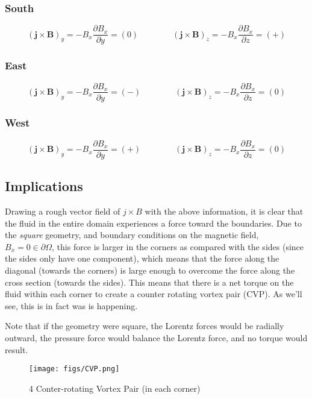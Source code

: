 \documentclass[11pt]{article}
\newcommand{\BfigS}{50em}
\newcommand{\BfigH}{\BfigS}
\newcommand{\BfigW}{\BfigS}
\begin{document}
\subsubsection{South}
\begin{equation}
	(\pmb{j} \times \pmb{B})_y = - B_x \frac{\partial B_x}{\partial y} = (0)
	\qquad \qquad
	(\pmb{j} \times \pmb{B})_z = - B_x \frac{\partial B_x}{\partial z} = (+)
\end{equation}
\subsubsection{East}
\begin{equation}
	(\pmb{j} \times \pmb{B})_y = - B_x \frac{\partial B_x}{\partial y} = (-)
	\qquad \qquad
	(\pmb{j} \times \pmb{B})_z = - B_x \frac{\partial B_x}{\partial z} = (0)
\end{equation}
\subsubsection{West}
\begin{equation}
	(\pmb{j} \times \pmb{B})_y = - B_x \frac{\partial B_x}{\partial y} = (+)
	\qquad \qquad
	(\pmb{j} \times \pmb{B})_z = - B_x \frac{\partial B_x}{\partial z} = (0)
\end{equation}

\subsection{Implications}

Drawing a rough vector field of $j\times B$ with the above information, it is clear that the fluid in the entire domain experiences a force toward the boundaries. Due to the \textit{square} geometry, and boundary conditions on the magnetic field, $B_x=0 \in \partial \Omega$, this force is larger in the corners as compared with the sides (since the sides only have one component), which means that the force along the diagonal (towards the corners) is large enough to overcome the force along the cross section (towards the sides). This means that there is a net torque on the fluid within each corner to create a counter rotating vortex pair (CVP). As we'll see, this is in fact was is happening.

Note that if the geometry were square, the Lorentz forces would be radially outward, the pressure force would balance the Lorentz force, and no torque would result.

\begin{figure}[H]
 \centering
  \texttt{[image: figs/CVP.png]}
   \caption[Optional ]{4 Conter-rotating Vortex Pair (in each corner)}
\end{figure}
\end{document}
